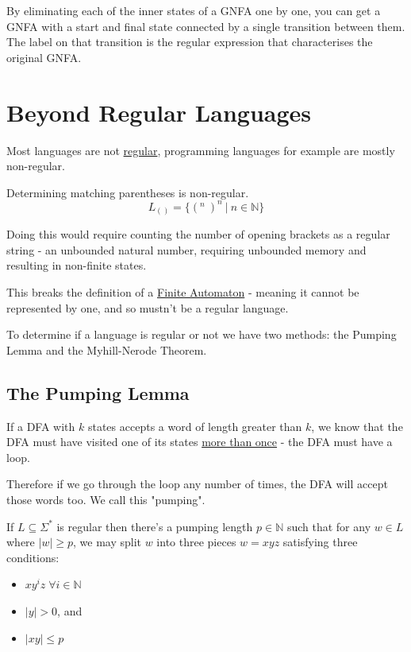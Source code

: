 \documentclass{article}
\begin{document}
By eliminating each of the inner states of a GNFA one by one, you can get a GNFA with a start and final state connected by a single transition between them. The label on that transition is the regular expression that characterises the original GNFA.

\newpage

\section{Beyond Regular Languages}\label{non-regular-languages}
Most languages are not \hyperref[regular-languages]{regular}, programming languages for example are mostly non-regular.

Determining matching parentheses is non-regular.
\[ L_{()} = \{(^n \: )^n \:|\: n \in \mathbb{N}\} \]

Doing this would require counting the number of opening brackets as a regular string - an unbounded natural number, requiring unbounded memory and resulting in non-finite states.

This breaks the definition of a \hyperref[finite-automata]{Finite Automaton} - meaning it cannot be represented by one, and so mustn't be a regular language.

To determine if a language is regular or not we have two methods: the Pumping Lemma and the Myhill-Nerode Theorem.

\subsection{The Pumping Lemma}\label{pumping-lemma}
If a DFA with $k$ states accepts a word of length greater than $k$, we know that the DFA must have visited one of its states \hyperref[pigeonhole-principle]{more than once} - the DFA must have a loop.

Therefore if we go through the loop any number of times, the DFA will accept those words too. We call this "pumping".

If $L \subseteq \Sigma^*$ is regular then there's a pumping length $p \in \mathbb{N}$ such that for any $w \in L$ where $|w| \geq p$, we may split $w$ into three pieces $w=xyz$ satisfying three conditions:
\begin{itemize}
    \item $xy^iz \; \forall i \in \mathbb{N}$
    \item $|y| > 0$, and
    \item $|xy| \leq p$
\end{itemize}
\end{document}
